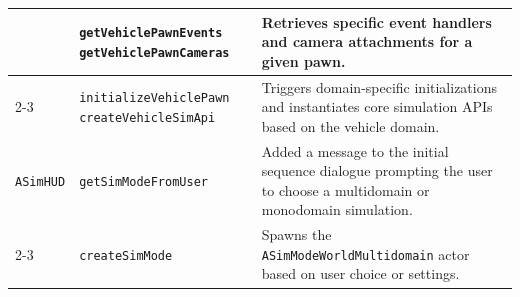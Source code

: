 \begin{longtable}{|p{}|p{}|p{}|}
    & \texttt{getVehiclePawnEvents} \newline \texttt{getVehiclePawnCameras} 
    & Retrieves specific event handlers and camera attachments for a given pawn. \\ \cline{2-3}
    
    & \texttt{initializeVehiclePawn} \newline \texttt{createVehicleSimApi} 
    & Triggers domain-specific initializations and instantiates core simulation APIs based on the vehicle domain. \\
    \hline

    \texttt{ASimHUD} 
    & \texttt{getSimModeFromUser} 
    & Added a message to the initial sequence dialogue prompting the user to choose a multidomain or monodomain simulation. \\ \cline{2-3}
    
    & \texttt{createSimMode} 
    & Spawns the \texttt{ASimModeWorldMultidomain} actor based on user choice or settings. \\ 
    \hline
    
\end{longtable}
